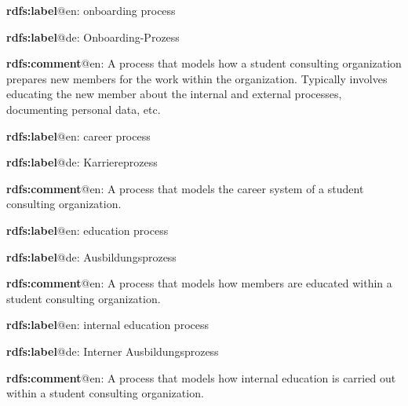 \documentclass[a4paper, DIV=13, BCOR=0cm]{scrbook}
\begin{document}
\begin{mdframed}[style=onto-2, frametitle={Onboarding\_Process}]
	{%
		\begin{compactitem}
			\item \textbf{rdfs:label}@en: onboarding process
			\item \textbf{rdfs:label}@de: Onboarding-Prozess
			\item \textbf{rdfs:comment}@en: A process that models how a student consulting organization prepares new members for the work within the organization. Typically involves educating the new member about the internal and external processes, documenting personal data, etc.
		\end{compactitem}
	} %
\end{mdframed}

\begin{mdframed}[style=onto-2, frametitle={Career\_Process}]
	{%
		\begin{compactitem}
			\item \textbf{rdfs:label}@en: career process
			\item \textbf{rdfs:label}@de: Karriereprozess
			\item \textbf{rdfs:comment}@en: A process that models the career system of a student consulting organization.
		\end{compactitem}
	} %
\end{mdframed}

\begin{mdframed}[style=onto-3, frametitle={Education\_Process}]
	{%
		\begin{compactitem}
			\item \textbf{rdfs:label}@en: education process
			\item \textbf{rdfs:label}@de: Ausbildungsprozess
			\item \textbf{rdfs:comment}@en: A process that models how members are educated within a student consulting organization.
		\end{compactitem}
	} %
\end{mdframed}

\begin{mdframed}[style=onto-4, frametitle={Internal\_Education\_Process}]
	{%
		\begin{compactitem}
			\item \textbf{rdfs:label}@en: internal education process
			\item \textbf{rdfs:label}@de: Interner Ausbildungsprozess
			\item \textbf{rdfs:comment}@en: A process that models how internal education is carried out within a student consulting organization.
		\end{compactitem}
	} %
\end{mdframed}
\end{document}
